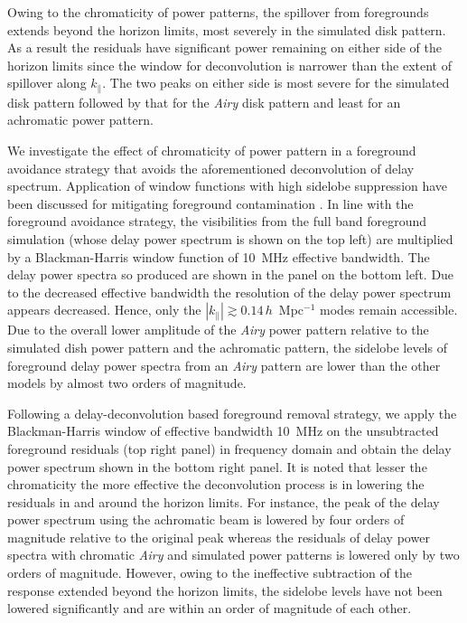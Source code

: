 \documentclass[preprint2,iop,numberedappendix,twocolappendix,appendixfloats]{emulateapj}
\begin{document}
Owing to the chromaticity of power patterns, the spillover from foregrounds extends beyond the horizon limits, most severely in the simulated disk pattern. As a result the residuals have significant power remaining on either side of the horizon limits since the window for deconvolution is narrower than the extent of spillover along $k_\parallel$. The two peaks on either side is most severe for the simulated disk pattern followed by that for the {\it Airy} disk pattern and least for an achromatic power pattern. 

We investigate the effect of chromaticity of power pattern in a foreground avoidance strategy that avoids the aforementioned deconvolution of delay spectrum. Application of window functions with high sidelobe suppression have been discussed for mitigating foreground contamination \citep{thy13}. In line with the foreground avoidance strategy, the visibilities from the full band foreground simulation (whose delay power spectrum is shown on the top left) are multiplied by a Blackman-Harris window function of 10~MHz effective bandwidth. The delay power spectra so produced are shown in the panel on the bottom left. Due to the decreased effective bandwidth the resolution of the delay power spectrum appears decreased. Hence, only the $|k_\parallel| \gtrsim 0.14\,h$~Mpc$^{-1}$ modes remain accessible. Due to the overall lower amplitude of the {\it Airy} power pattern relative to the simulated dish power pattern and the achromatic pattern, the sidelobe levels of foreground delay power spectra from an {\it Airy} pattern are lower than the other models by almost two orders of magnitude. 

Following a delay-deconvolution based foreground removal strategy, we apply the Blackman-Harris window of effective bandwidth 10~MHz on the unsubtracted foreground residuals (top right panel) in frequency domain and obtain the delay power spectrum shown in the bottom right panel. It is noted that lesser the chromaticity the more effective the deconvolution process is in lowering the residuals in and around the horizon limits. For instance, the peak of the delay power spectrum using the achromatic beam is lowered by four orders of magnitude relative to the original peak whereas the residuals of delay power spectra with chromatic {\it Airy} and simulated power patterns is lowered only by two orders of magnitude. However, owing to the ineffective subtraction of the response extended beyond the horizon limits, the sidelobe levels have not been lowered significantly and are within an order of magnitude of each other.
\end{document}
